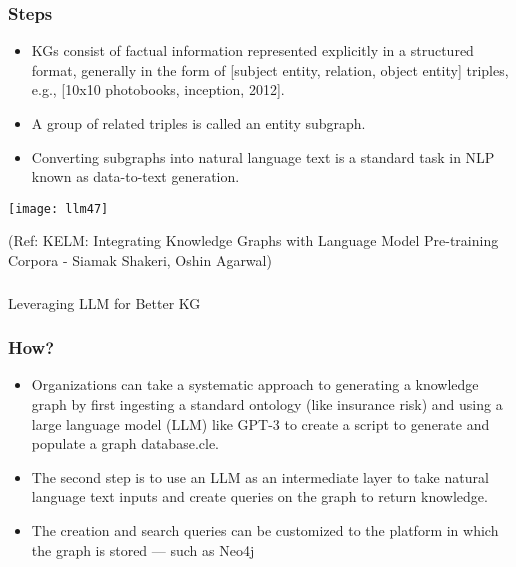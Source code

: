 \begin{frame}[fragile]\frametitle{Steps}

\begin{itemize}
\item KGs consist of factual information represented explicitly in a structured format, generally in the form of [subject entity, relation, object entity] triples, e.g., [10x10 photobooks, inception, 2012]. 
\item A group of related triples is called an entity subgraph. 
\item Converting subgraphs into natural language text is a standard task in NLP known as data-to-text generation.
\end{itemize}

\begin{center}
\texttt{[image: llm47]}
\end{center}	

{\tiny (Ref: KELM: Integrating Knowledge Graphs with Language Model Pre-training Corpora - Siamak Shakeri, Oshin Agarwal)}
\end{frame}




\begin{frame}[fragile]\frametitle{}
\begin{center}
{\Large Leveraging LLM for Better KG}

\end{center}
\end{frame}

\begin{frame}[fragile]\frametitle{How?}

\begin{itemize}
\item Organizations can take a systematic approach to generating a knowledge graph by first ingesting a standard ontology (like insurance risk) and using a large language model (LLM) like GPT-3 to create a script to generate and populate a graph database.cle.
\item The second step is to use an LLM as an intermediate layer to take natural language text inputs and create queries on the graph to return knowledge. 
\item The creation and search queries can be customized to the platform in which the graph is stored — such as Neo4j
\end{itemize}
\end{frame}

